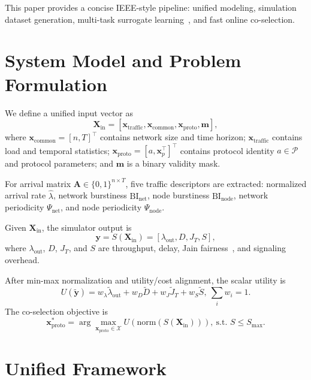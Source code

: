 \documentclass[conference]{IEEEtran}
\begin{document}
This paper provides a concise IEEE-style pipeline: unified modeling, simulation dataset generation, multi-task surrogate learning~\cite{caruana1997multitask}, and fast online co-selection.

\section{System Model and Problem Formulation}
We define a unified input vector as
\begin{equation}
\mathbf{X}_{\mathrm{in}}=[\mathbf{x}_{\mathrm{traffic}},\mathbf{x}_{\mathrm{common}},\mathbf{x}_{\mathrm{proto}},\mathbf{m}],
\end{equation}
where $\mathbf{x}_{\mathrm{common}}=[n,T]^\top$ contains network size and time horizon; $\mathbf{x}_{\mathrm{traffic}}$ contains load and temporal statistics; $\mathbf{x}_{\mathrm{proto}}=[a,\mathbf{x}_p^\top]^\top$ contains protocol identity $a\in\mathcal{P}$ and protocol parameters; and $\mathbf{m}$ is a binary validity mask.

For arrival matrix $\mathbf{A}\in\{0,1\}^{n\times T}$, five traffic descriptors are extracted: normalized arrival rate $\hat{\lambda}$, network burstiness $\mathrm{BI}_{\mathrm{net}}$, node burstiness $\mathrm{BI}_{\mathrm{node}}$, network periodicity $\Psi_{\mathrm{net}}$, and node periodicity $\Psi_{\mathrm{node}}$.

Given $\mathbf{X}_{\mathrm{in}}$, the simulator output is
\begin{equation}
\mathbf{y}=S(\mathbf{X}_{\mathrm{in}})=[\lambda_{\mathrm{out}},D,J_T,S],
\end{equation}
where $\lambda_{\mathrm{out}}$, $D$, $J_T$, and $S$ are throughput, delay, Jain fairness~\cite{jain1984quantitative}, and signaling overhead.

After min-max normalization and utility/cost alignment, the scalar utility is
\begin{equation}
U(\tilde{\mathbf{y}})=w_\lambda\tilde{\lambda}_{\mathrm{out}}+w_D\tilde{D}+w_J\tilde{J}_T+w_S\tilde{S},\ \sum_i w_i=1.
\end{equation}
The co-selection objective is
\begin{equation}
\mathbf{x}_{\mathrm{proto}}^*=\arg\max_{\mathbf{x}_{\mathrm{proto}}\in\mathcal{X}} U\!\left(\mathrm{norm}\left(S(\mathbf{X}_{\mathrm{in}})\right)\right),\ \text{s.t. } S\le S_{\max}.
\end{equation}

\section{Unified Framework}
\end{document}
